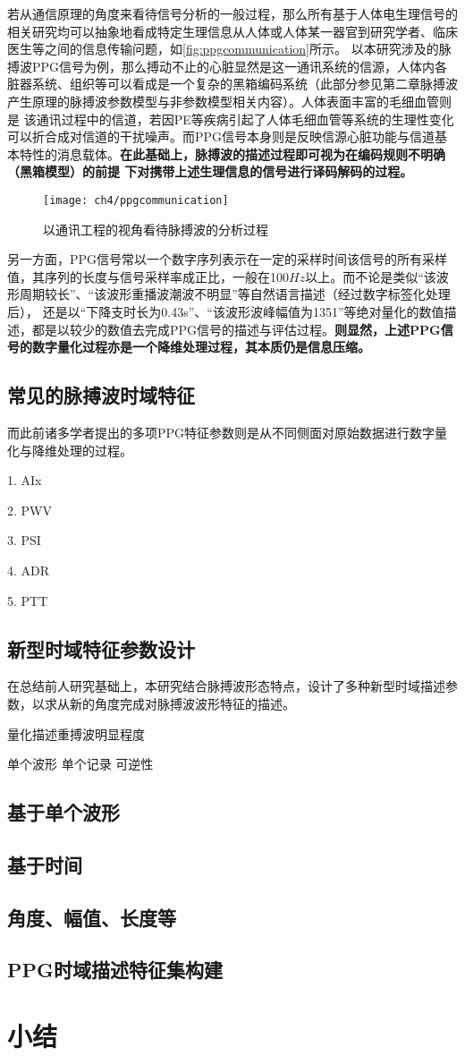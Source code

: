 若从通信原理的角度来看待信号分析的一般过程，那么所有基于人体电生理信号的相关研究均可以抽象地看成特定生理信息从人体或人体某一器官到研究学者、临床医生等之间的信息传输问题，如\autoref{fig:ppgcommunication}所示。
以本研究涉及的脉搏波PPG信号为例，那么搏动不止的心脏显然是这一通讯系统的信源，人体内各脏器系统、组织等可以看成是一个复杂的黑箱编码系统（此部分参见第二章脉搏波产生原理的脉搏波参数模型与非参数模型相关内容）。人体表面丰富的毛细血管则是
该通讯过程中的信道，若因PE等疾病引起了人体毛细血管等系统的生理性变化可以折合成对信道的干扰噪声。而PPG信号本身则是反映信源心脏功能与信道基本特性的消息载体。\textbf{在此基础上，脉搏波的描述过程即可视为在编码规则不明确（黑箱模型）的前提
下对携带上述生理信息的信号进行译码解码的过程。}
\begin{figure}[htbp]
    \centering
    \texttt{[image: ch4/ppgcommunication]}
    \caption{\label{fig:ppgcommunication}以通讯工程的视角看待脉搏波的分析过程}
\end{figure}

另一方面，PPG信号常以一个数字序列表示在一定的采样时间该信号的所有采样值，其序列的长度与信号采样率成正比，一般在100$Hz$以上。而不论是类似“该波形周期较长”、“该波形重播波潮波不明显”等自然语言描述（经过数字标签化处理后），
还是以“下降支时长为0.43s”、“该波形波峰幅值为1351”等绝对量化的数值描述，都是以较少的数值去完成PPG信号的描述与评估过程。\textbf{则显然，上述PPG信号的数字量化过程亦是一个降维处理过程，其本质仍是信息压缩。}

\subsection{常见的脉搏波时域特征}
而此前诸多学者提出的多项PPG特征参数则是从不同侧面对原始数据进行数字量化与降维处理的过程。

1. AIx

2. PWV

3. PSI

4. ADR

5. PTT

\subsection{新型时域特征参数设计}
在总结前人研究基础上，本研究结合脉搏波形态特点，设计了多种新型时域描述参数，以求从新的角度完成对脉搏波波形特征的描述。

量化描述重搏波明显程度

单个波形
单个记录
可逆性
\subsection{基于单个波形}
\subsection{基于时间}
\subsection{角度、幅值、长度等}
\subsection{PPG时域描述特征集构建}
\section{小结}